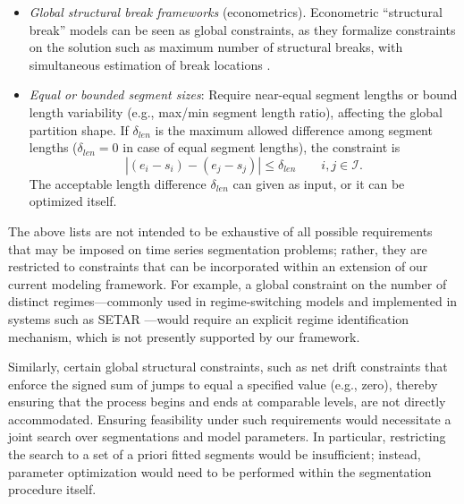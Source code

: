 \documentclass[preprints,article,submit,pdftex,moreauthors]{Definitions/mdpi}
\begin{document}
\begin{itemize}
	Such constraints may either enforce a specific pattern or restrict its complexity (e.g., by bounding the number of direction alternations) \cite{HRFB22}. They can also be formulated negatively as forbidden-pattern constraints, excluding certain global configurations. Examples include limiting the total number of alternations to at most $n_a$, or forbidding recurring structures such as repeated “short–long–short” segment sequences. These formulations amount to global pattern-avoidance constraints on the segmentation.

	\item {\it Global structural break frameworks} (econometrics).	
	Econometric “structural break” models can be seen as global constraints, as they formalize constraints on the solution such as maximum number of structural breaks, with simultaneous estimation of break locations \cite{BP98, CP19}. 
		
	\item {\it Equal or bounded segment sizes}: Require near-equal segment lengths or bound length variability (e.g., max/min segment length ratio), affecting the global partition shape. If $\delta_{len}$ is the maximum allowed difference among segment lengths ($\delta_{len}=0$ in case of equal segment lengths), the constraint is 
	\begin{equation}
		|(e_i - s_i) - (e_j - s_j)| \leq \delta_{len} \qquad i,j\in \mathcal{I}.
	\end{equation}
	The acceptable length difference $\delta_{len}$ can given as input, or it can be optimized itself.
\end{itemize}

The above lists are not intended to be exhaustive of all possible requirements that may be imposed on time series segmentation problems; rather, they are restricted to constraints that can be incorporated within an extension of our current modeling framework. For example, a global constraint on the number of distinct regimes—commonly used in regime-switching models and implemented in systems such as SETAR \cite{TL90}—would require an explicit regime identification mechanism, which is not presently supported by our framework.

Similarly, certain global structural constraints, such as net drift constraints that enforce the signed sum of jumps to equal a specified value (e.g., zero), thereby ensuring that the process begins and ends at comparable levels, are not directly accommodated. Ensuring feasibility under such requirements would necessitate a joint search over segmentations and model parameters. In particular, restricting the search to a set of a priori fitted segments would be insufficient; instead, parameter optimization would need to be performed within the segmentation procedure itself.
\end{document}
